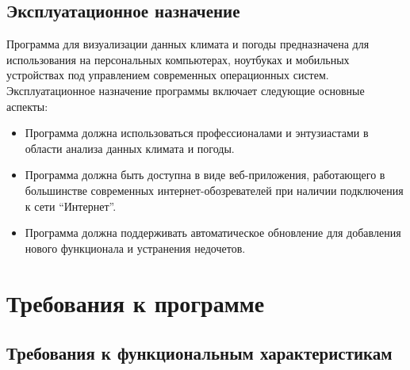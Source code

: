 \documentclass[a4paper, 12pt]{article}
\begin{document}
	\subsection{Эксплуатационное назначение}\label{section:3.2}

	Программа для визуализации данных климата и погоды предназначена для использования на персональных компьютерах, ноутбуках
	и мобильных устройствах под управлением современных операционных систем. Эксплуатационное назначение программы
	включает следующие основные аспекты:
	\begin{itemize}
		\item Программа должна использоваться профессионалами и энтузиастами в области анализа данных климата и погоды.

		\item Программа должна быть доступна в виде веб-приложения, работающего в большинстве современных интернет-обозревателей
			при наличии подключения к сети \enquote{Интернет}.

		\item Программа должна поддерживать автоматическое обновление для добавления нового функционала и устранения недочетов.
	\end{itemize}

	\section{Требования к программе}\label{section:4}

	\subsection{Требования к функциональным характеристикам}\label{section:4.1}
\end{document}
